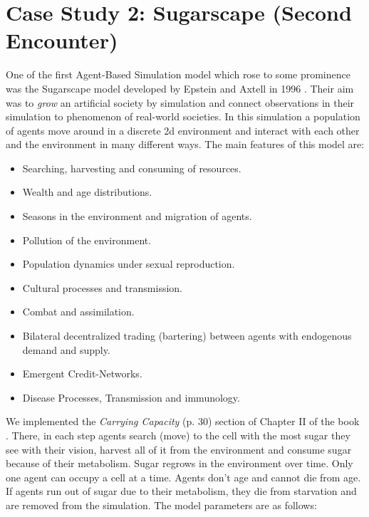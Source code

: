 \section{Case Study 2: Sugarscape (Second Encounter)}
One of the first  Agent-Based Simulation model which rose to some prominence was the Sugarscape model developed by Epstein and Axtell in 1996 \cite{epstein_growing_1996}. Their aim was to \textit{grow} an artificial society by simulation and connect observations in their simulation to phenomenon of real-world societies. In this simulation a population of agents move around in a discrete 2d environment and interact with each other and the environment in many different ways. The main features of this model are:

\begin{itemize}
	\item Searching, harvesting and consuming of resources.
	\item Wealth and age distributions.
	\item Seasons in the environment and migration of agents.
	\item Pollution of the environment.
	\item Population dynamics under sexual reproduction.
	\item Cultural processes and transmission.
	\item Combat and assimilation.
	\item Bilateral decentralized trading (bartering) between agents with endogenous demand and supply.
	\item Emergent Credit-Networks.
	\item Disease Processes, Transmission and immunology.
\end{itemize}

We implemented the \textit{Carrying Capacity} (p. 30) section of Chapter II of the book \cite{epstein_growing_1996}. There, in each step agents search (move) to the cell with the most sugar they see with their vision, harvest all of it from the environment and consume sugar because of their metabolism. Sugar regrows in the environment over time. Only one agent can occupy a cell at a time. Agents don't age and cannot die from age. If agents run out of sugar due to their metabolism, they die from starvation and are removed from the simulation. The model parameters are as follows:

